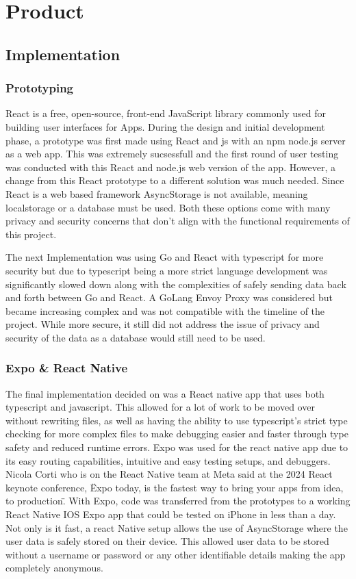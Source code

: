 \section{Product}\label{product}

\subsection{Implementation}

\subsubsection{Prototyping}
React is a free, open-source, front-end JavaScript library commonly used for building user interfaces for Apps\cite{React2025}. During the design and initial development phase, a prototype was first made using React and js with an npm node.js server as a web app. This was extremely sucsessfull and the first round of user testing was conducted with this React and node.js web version of the app. However, a change from this React prototype to a different solution was much needed. Since React is a web based framework AsyncStorage is not available, meaning localstorage or a database must be used. Both these options come with many privacy and security concerns that don't align with the functional requirements of this project.

The next Implementation was using Go and React with typescript for more security but due to typescript being a more strict language development was significantly slowed down along with the complexities of safely sending data back and forth between Go and React. A GoLang Envoy Proxy was considered but became increasing complex and was not compatible with the timeline of the project. While more secure, it still did not address the issue of privacy and security of the data as a database would still need to be used.

\subsubsection{Expo \& React Native}
The final implementation decided on was a React native app that uses both typescript and javascript. This allowed for a lot of work to be moved over without rewriting files, as well as having the ability to use typescript's strict type checking for more complex files to make debugging easier and faster through type safety and reduced runtime errors. Expo was used for the react native app due to its easy routing capabilities, intuitive and easy testing setups, and debuggers. Nicola Corti who is on the React Native team at Meta said at the 2024 React keynote conference, \"Expo today, is the fastest way to bring your apps from idea, to production\". With Expo, code was transferred from the prototypes to a working React Native IOS Expo app that could be tested on iPhone in less than a day. Not only is it fast, a react Native setup allows the use of AsyncStorage where the user data is safely stored on their device. This allowed user data to be stored without a username or password or any other identifiable details making the app completely anonymous. 

